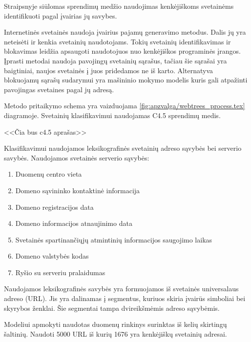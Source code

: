 
Straipsnyje  siūlomas sprendimų medžio naudojimas kenkėjiškoms svetainėms identifikuoti pagal įvairias jų
savybes.


Internetinės svetainės naudoja įvairius pajamų generavimo metodus. Dalis jų yra neteisėti ir kenkia svetainių naudotojams.
Tokių svetainių identifikavimas ir blokavimas leidžia apsaugoti naudotojuos nuo kenkėjiškos programinės įrangos. Įprasti
metodai naudoja pavojingų svetainių sąrašus, tačiau šie sąrašai yra baigtiniai, naujos svetainės į juos pridedamos ne
iš karto. Alternatyva blokuojamų sąrašų sudarymui yra mašininio mokymo modelis kuris gali atpažinti pavojingas svetaines
pagal jų adresą.



Metodo pritaikymo schema yra vaizduojama \vref{fig:apzvalga/webtrees_process.tex} diagramoje. Svetainių klasifikavimui
naudojamas C4.5 sprendimų medis.

<<Čia bus c4.5 aprašas>>

Klasifikavimui naudojamos leksikografinės svetainių adreso sąvybės bei serverio savybės. Naudojamos svetainės serverio sąvybės:
\begin{enumerate}[label=\arabic*.]
    \item Duomenų centro vieta
    \item Domeno sąvininko kontaktinė informacija
    \item Domeno registracijos data
    \item Domeno informacijos atnaujinimo data
    \item Svetainės spartinančiųjų atmintinių informacijos saugojimo laikas
    \item Domeno valstybės kodas
    \item Ryšio su serveriu pralaidumas
\end{enumerate}

Naudojamos leksikografinės savybės yra formuojamos iš svetainės universalaus adreso (URL). Jis yra dalinamas į segmentus,
kuriuos skiria įvairūs simboliai bei skyrybos ženklai. Šie segmentai tampa dvireikšmėmis adreso sąvybėmis.


Modeliui apmokyti naudotas duomenų rinkinys surinktas iš kelių skirtingų šaltinių. Naudoti 5000 URL iš kurių 1676 yra
kenkėjiškų svetainių adresai.

